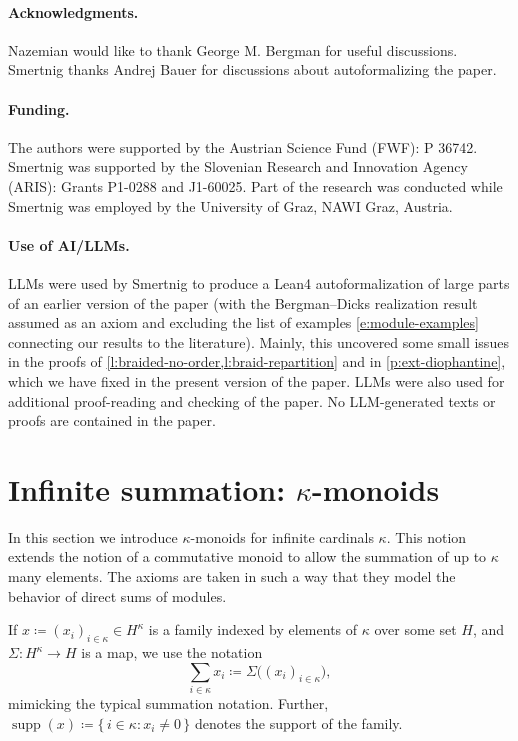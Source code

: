 \documentclass[a4paper,11pt,oneside]{amsart}
\theoremstyle{remark}
\DeclareMathOperator{\supp}{supp}
\newcommand{\defit}[1]{\textsf{#1}}
\begin{document}
\smallskip\paragraph{Acknowledgments.}
Nazemian would like to thank George M. Bergman for useful discussions.
Smertnig thanks Andrej Bauer for discussions about autoformalizing the paper.

\smallskip\paragraph{Funding.}
The authors were supported by the Austrian Science Fund (FWF): P 36742.
Smertnig was supported by the Slovenian Research and Innovation Agency (ARIS): Grants P1-0288 and J1-60025.
Part of the research was conducted while Smertnig was employed by the University of Graz, NAWI Graz, Austria.

\smallskip\paragraph{Use of AI/LLMs.}
LLMs were used by Smertnig to produce a Lean4 autoformalization of large parts of an earlier version of the paper (with the Bergman--Dicks realization result assumed as an axiom and excluding the list of examples \cref{e:module-examples} connecting our results to the literature).
Mainly, this uncovered some small issues in the proofs of \cref{l:braided-no-order,l:braid-repartition} and in \cref{p:ext-diophantine}, which we have fixed in the present version of the paper.
LLMs were also used for additional proof-reading and checking of the paper.
No LLM-generated texts or proofs are contained in the paper.

\section{Infinite summation: \texorpdfstring{$\kappa$}{κ}-monoids} \label{sec:kappa-monoids}

In this section we introduce \defit{$\kappa$-monoids} for infinite cardinals $\kappa$.
This notion extends the notion of a commutative monoid to allow the summation of up to $\kappa$ many elements.
The axioms are taken in such a way that they model the behavior of direct sums of modules.

If $x \coloneqq (x_i)_{i \in \kappa} \in H^{\kappa}$ is a family indexed by elements of $\kappa$ over some set $H$, and $\Sigma \colon H^{\kappa} \to H$ is a map, we use the notation
\[
  \sum_{i \in \kappa} x_i \coloneqq \Sigma\big( (x_i)_{i \in \kappa}\big),
\]
mimicking the typical summation notation. 
Further, $\supp(x) \coloneqq \{\, i \in \kappa : x_i \ne 0 \,\}$ denotes the \defit{support} of the family.
\end{document}
